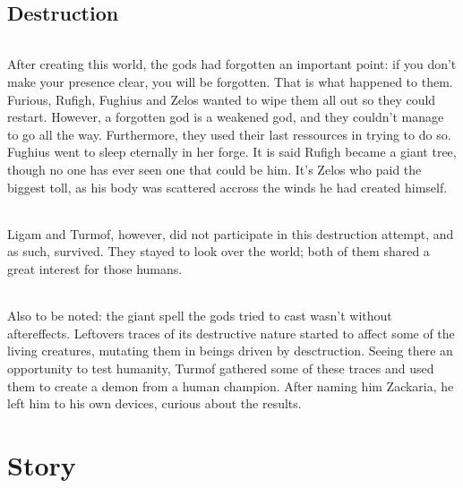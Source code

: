 \documentclass[a4paper,12pt]{book}
\begin{document}
		\chapter{Destruction}
			\paragraph{} After creating this world, the gods had forgotten an important point: if you don't make your presence clear, you will be forgotten. That is what happened to them. Furious, Rufigh, Fughius and Zelos wanted to wipe them all out so they could restart. However, a forgotten god is a weakened god, and they couldn't manage to go all the way. Furthermore, they used their last ressources in trying to do so. Fughius went to sleep eternally in her forge. It is said Rufigh became a giant tree, though no one has ever seen one that could be him. It's Zelos who paid the biggest toll, as his body was scattered accross the winds he had created himself.
			\paragraph{} Ligam and Turmof, however, did not participate in this destruction attempt, and as such, survived. They stayed to look over the world; both of them shared a great interest for those humans.
			\paragraph{} Also to be noted: the giant spell the gods tried to cast wasn't without aftereffects. Leftovers traces of its destructive nature started to affect some of the living creatures, mutating them in beings driven by desctruction. Seeing there an opportunity to test humanity, Turmof gathered some of these traces and used them to create a demon from a human champion. After naming him Zackaria, he left him to his own devices, curious about the results.
	\part{Story}
\end{document}
